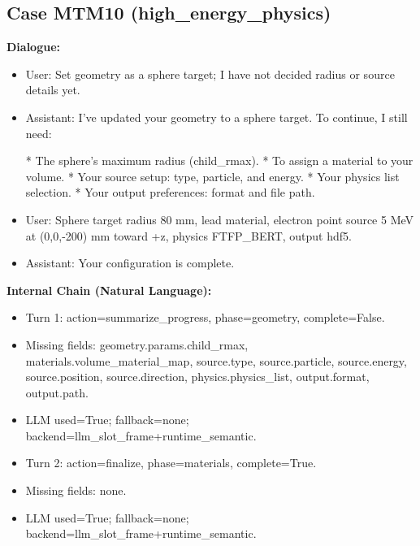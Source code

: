 \documentclass[11pt]{ctexart}
\begin{document}
\subsection{Case MTM10 (high\_energy\_physics)}
\textbf{Dialogue:}
\begin{itemize}
\item User: Set geometry as a sphere target; I have not decided radius or source details yet.
\item Assistant: I've updated your geometry to a sphere target. To continue, I still need:

*   The sphere's maximum radius (child\_rmax).
*   To assign a material to your volume.
*   Your source setup: type, particle, and energy.
*   Your physics list selection.
*   Your output preferences: format and file path.
\item User: Sphere target radius 80 mm, lead material, electron point source 5 MeV at (0,0,-200) mm toward +z, physics FTFP\_BERT, output hdf5.
\item Assistant: Your configuration is complete.
\end{itemize}
\textbf{Internal Chain (Natural Language):}
\begin{itemize}
\item Turn 1: action=summarize\_progress, phase=geometry, complete=False.
\item Missing fields: geometry.params.child\_rmax, materials.volume\_material\_map, source.type, source.particle, source.energy, source.position, source.direction, physics.physics\_list, output.format, output.path.
\item LLM used=True; fallback=none; backend=llm\_slot\_frame+runtime\_semantic.
\item Turn 2: action=finalize, phase=materials, complete=True.
\item Missing fields: none.
\item LLM used=True; fallback=none; backend=llm\_slot\_frame+runtime\_semantic.
\end{itemize}
\end{document}
